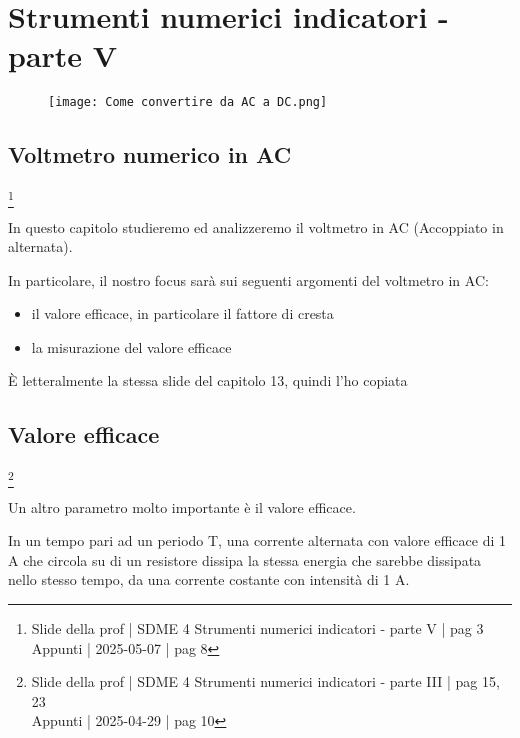 \chapter{Strumenti numerici indicatori - parte V}

\begin{figure}[h]
    \centering
    \texttt{[image: Come convertire da AC a DC.png]}
\end{figure}

\newpage    

\section{Voltmetro numerico in AC}
\footnote{Slide della prof | SDME 4 Strumenti numerici indicatori - parte V | pag 3 \\  
Appunti | 2025-05-07 | pag 8}

In questo capitolo studieremo ed analizzeremo il voltmetro in AC (Accoppiato in alternata). \newline 

In particolare, il nostro focus sarà sui seguenti argomenti del voltmetro in AC: 

\begin{itemize}
    \item il valore efficace, in particolare il fattore di cresta 
    \item la misurazione del valore efficace
\end{itemize}

\newpage 

\begin{tcolorbox}
    È letteralmente la stessa slide del capitolo 13, quindi l'ho copiata
\end{tcolorbox}

\section{Valore efficace}
\footnote{Slide della prof | SDME 4 Strumenti numerici indicatori - parte III | pag  15, 23 \\  
Appunti | 2025-04-29 | pag 10} 

Un altro parametro molto importante è il valore efficace. \newline 

In un tempo pari ad un periodo T, una corrente alternata con valore efficace di 1 A che circola su di un resistore 
dissipa la stessa energia che sarebbe dissipata nello stesso tempo, da una corrente costante con intensità di 1 A. \newline 

